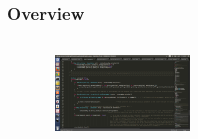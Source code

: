 \begin{frame}
	\frametitle{Overview} 
	\begin{columns}
		\tableofcontents[] 
		\begin{figure}
		\includegraphics[width=4cm ,height=2cm]{pic1.png}
		\end{figure}
	\end{columns}
\end{frame}

